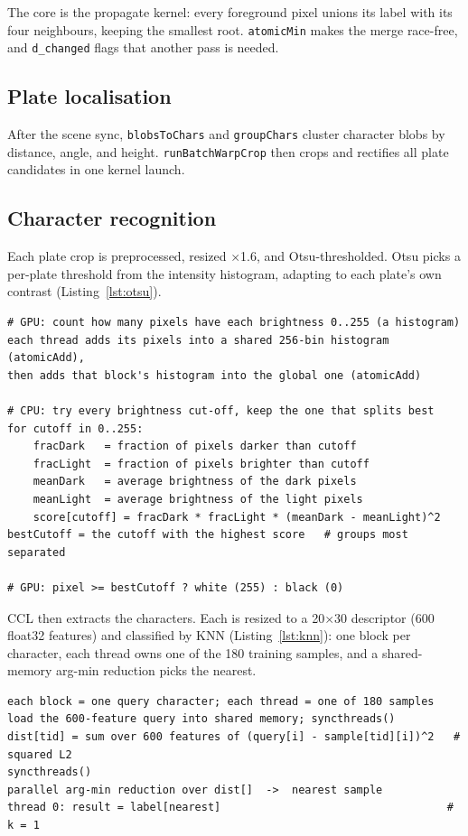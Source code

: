 The core is the propagate kernel: every foreground pixel unions its label with its four neighbours, keeping the smallest root.
\texttt{atomicMin} makes the merge race-free, and \texttt{d\_changed} flags that another pass is needed.

\subsection{Plate localisation}
\label{sec:platelocal}

After the scene sync, \texttt{blobsToChars} and \texttt{groupChars} cluster character blobs by distance, angle, and height.
\texttt{runBatchWarpCrop} then crops and rectifies all plate candidates in one kernel launch.

\subsection{Character recognition}
\label{sec:charrec}

Each plate crop is preprocessed, resized $\times$1.6, and Otsu-thresholded.
Otsu picks a per-plate threshold from the intensity histogram, adapting to each plate's own contrast (Listing~\ref{lst:otsu}).

\begin{lstlisting}[caption={Otsu threshold: GPU histogram, CPU threshold search, GPU apply (\texttt{src/device/OtsuThreshold.cu}).},label={lst:otsu}]
# GPU: count how many pixels have each brightness 0..255 (a histogram)
each thread adds its pixels into a shared 256-bin histogram (atomicAdd),
then adds that block's histogram into the global one (atomicAdd)

# CPU: try every brightness cut-off, keep the one that splits best
for cutoff in 0..255:
    fracDark   = fraction of pixels darker than cutoff
    fracLight  = fraction of pixels brighter than cutoff
    meanDark   = average brightness of the dark pixels
    meanLight  = average brightness of the light pixels
    score[cutoff] = fracDark * fracLight * (meanDark - meanLight)^2
bestCutoff = the cutoff with the highest score   # groups most separated

# GPU: pixel >= bestCutoff ? white (255) : black (0)
\end{lstlisting}

CCL then extracts the characters.
Each is resized to a 20$\times$30 descriptor (600 float32 features) and classified by KNN (Listing~\ref{lst:knn}): one block per character, each thread owns one of the 180 training samples, and a shared-memory arg-min reduction picks the nearest.
\begin{lstlisting}[caption={KNN classify: one block per character, $k$=1 (\texttt{src/device/KNN.cu}).},label={lst:knn}]
each block = one query character; each thread = one of 180 samples
load the 600-feature query into shared memory; syncthreads()
dist[tid] = sum over 600 features of (query[i] - sample[tid][i])^2   # squared L2
syncthreads()
parallel arg-min reduction over dist[]  ->  nearest sample
thread 0: result = label[nearest]                                   # k = 1
\end{lstlisting}

